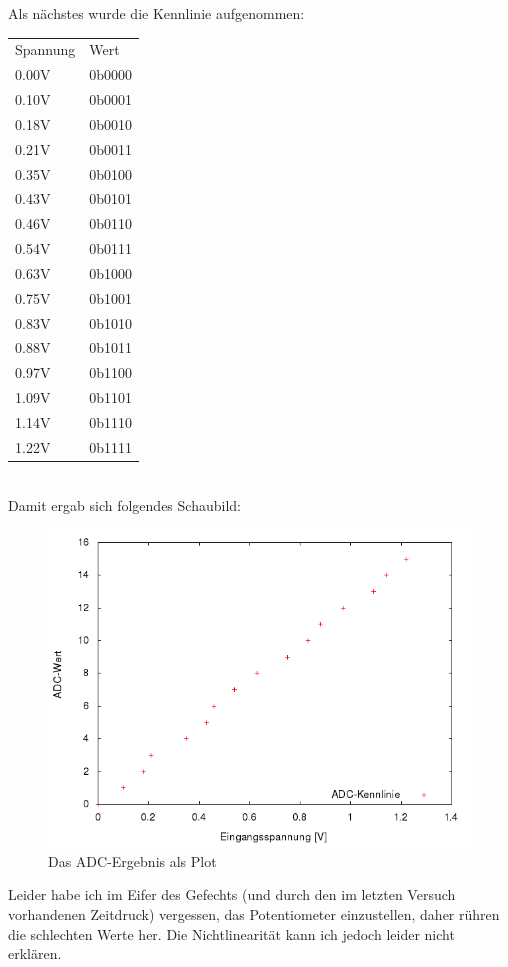Als nächstes wurde die Kennlinie aufgenommen:
\begin{tabular}{ll}
	Spannung & Wert\\
	0.00V & 0b0000\\
	0.10V & 0b0001\\
	0.18V & 0b0010\\
	0.21V & 0b0011\\
	0.35V & 0b0100\\
	0.43V & 0b0101\\
	0.46V & 0b0110\\
	0.54V & 0b0111\\
	0.63V & 0b1000\\
	0.75V & 0b1001\\
	0.83V & 0b1010\\
	0.88V & 0b1011\\
	0.97V & 0b1100\\
	1.09V & 0b1101\\
	1.14V & 0b1110\\
	1.22V & 0b1111\\
\end{tabular}\\
Damit ergab sich folgendes Schaubild:
\begin{figure}[H]
	\centering
	\includegraphics[width=\linewidth]{versuch9/versuch_9_3.png}
	\caption{Das ADC-Ergebnis als Plot}
\end{figure}
Leider habe ich im Eifer des Gefechts (und durch den im letzten Versuch vorhandenen Zeitdruck) vergessen, das Potentiometer einzustellen, daher rühren die schlechten Werte her. Die Nichtlinearität kann ich jedoch leider nicht erklären.

